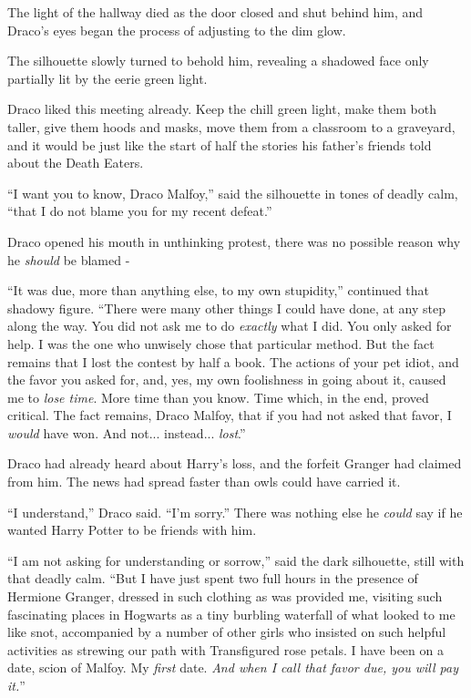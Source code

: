 The light of the hallway died as the door closed and shut behind him, and Draco's eyes began the process of adjusting to the dim glow.

The silhouette slowly turned to behold him, revealing a shadowed face only partially lit by the eerie green light.

Draco liked this meeting already. Keep the chill green light, make them both taller, give them hoods and masks, move them from a classroom to a graveyard, and it would be just like the start of half the stories his father's friends told about the Death Eaters.

``I want you to know, Draco Malfoy,'' said the silhouette in tones of deadly calm, ``that I do not blame you for my recent defeat.''

Draco opened his mouth in unthinking protest, there was no possible reason why he \emph{should} be blamed -

``It was due, more than anything else, to my own stupidity,'' continued that shadowy figure. ``There were many other things I could have done, at any step along the way. You did not ask me to do \emph{exactly} what I did. You only asked for help. I was the one who unwisely chose that particular method. But the fact remains that I lost the contest by half a book. The actions of your pet idiot, and the favor you asked for, and, yes, my own foolishness in going about it, caused me to \emph{lose time}. More time than you know. Time which, in the end, proved critical. The fact remains, Draco Malfoy, that if you had not asked that favor, I \emph{would} have won. And not... instead... \emph{lost}.''

Draco had already heard about Harry's loss, and the forfeit Granger had claimed from him. The news had spread faster than owls could have carried it.

``I understand,'' Draco said. ``I'm sorry.'' There was nothing else he \emph{could} say if he wanted Harry Potter to be friends with him.

``I am not asking for understanding or sorrow,'' said the dark silhouette, still with that deadly calm. ``But I have just spent two full hours in the presence of Hermione Granger, dressed in such clothing as was provided me, visiting such fascinating places in Hogwarts as a tiny burbling waterfall of what looked to me like snot, accompanied by a number of other girls who insisted on such helpful activities as strewing our path with Transfigured rose petals. I have been on a date, scion of Malfoy. My \emph{first} date. \emph{And when I call that favor due, you will pay it.}''

